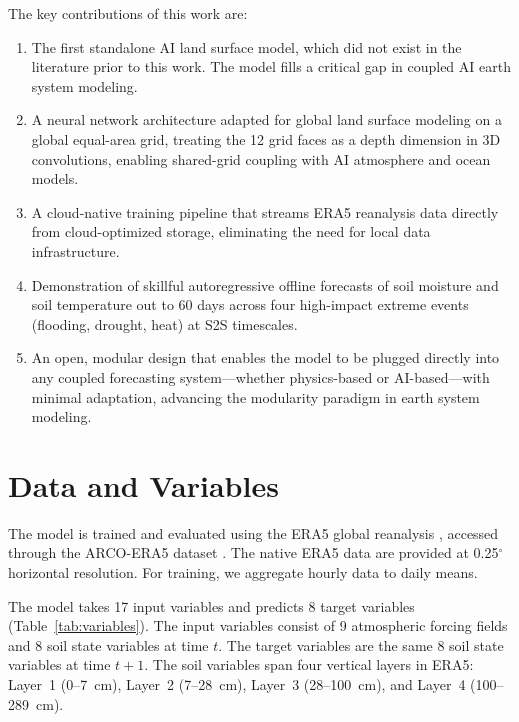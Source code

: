 \documentclass[11pt]{article}
\begin{document}
The key contributions of this work are:
\begin{enumerate}
    \item The first standalone AI land surface model, which did not exist in the literature prior to this work. The model fills a critical gap in coupled AI earth system modeling.
    \item A neural network architecture adapted for global land surface modeling on a global equal-area grid, treating the 12 grid faces as a depth dimension in 3D convolutions, enabling shared-grid coupling with AI atmosphere and ocean models.
    \item A cloud-native training pipeline that streams ERA5 reanalysis data directly from cloud-optimized storage, eliminating the need for local data infrastructure.
    \item Demonstration of skillful autoregressive offline forecasts of soil moisture and soil temperature out to 60 days across four high-impact extreme events (flooding, drought, heat) at S2S timescales.
    \item An open, modular design that enables the model to be plugged directly into any coupled forecasting system---whether physics-based or AI-based---with minimal adaptation, advancing the modularity paradigm in earth system modeling.
\end{enumerate}

\section{Data and Variables}
\label{sec:data}

The model is trained and evaluated using the ERA5 global reanalysis \citep{hersbach2020era5}, accessed through the ARCO-ERA5 dataset \citep{carver2023arcoera5}. The native ERA5 data are provided at 0.25$^\circ$ horizontal resolution. For training, we aggregate hourly data to daily means.

The model takes 17 input variables and predicts 8 target variables (Table~\ref{tab:variables}). The input variables consist of 9 atmospheric forcing fields and 8 soil state variables at time $t$. The target variables are the same 8 soil state variables at time $t+1$. The soil variables span four vertical layers in ERA5: Layer~1 (0--7~cm), Layer~2 (7--28~cm), Layer~3 (28--100~cm), and Layer~4 (100--289~cm).
\end{document}
